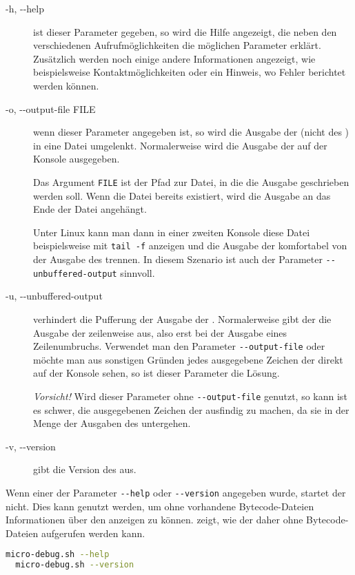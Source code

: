 \begin{description}
\item[-h, -{}-help]
  ist dieser Parameter gegeben, so wird die Hilfe angezeigt, die neben den verschiedenen Aufrufmöglichkeiten die möglichen Parameter erklärt. Zusätzlich werden noch einige andere Informationen angezeigt, wie beispielsweise Kontaktmöglichkeiten oder ein Hinweis, wo Fehler berichtet werden können.

\item[-o, -{}-output-file FILE]
  wenn dieser Parameter angegeben ist, so wird die Ausgabe der \mic (nicht des \md) in eine Datei umgelenkt. Normalerweise wird die Ausgabe der \mic auf der Konsole ausgegeben.

  Das Argument \texttt{FILE} ist der Pfad zur Datei, in die die Ausgabe geschrieben werden soll. Wenn die Datei bereits existiert, wird die Ausgabe an das Ende der Datei angehängt.

  Unter Linux kann man dann in einer zweiten Konsole diese Datei beispielsweise mit \texttt{tail~-f} anzeigen und die Ausgabe der \mic komfortabel von der Ausgabe des \md trennen. In diesem Szenario ist auch der Parameter \texttt{-{}-unbuffered-output} sinnvoll.

\item[-u, -{}-unbuffered-output]
  verhindert die Pufferung der Ausgabe der \mic. Normalerweise gibt der \md die Ausgabe der \mic zeilenweise aus, also erst bei der Ausgabe eines Zeilenumbruchs. Verwendet man den Parameter \texttt{-{}-output-file} oder möchte man aus sonstigen Gründen jedes ausgegebene Zeichen der \mic direkt auf der Konsole sehen, so ist dieser Parameter die Lösung.

  \emph{Vorsicht!} Wird dieser Parameter ohne \texttt{-{}-output-file} genutzt, so kann ist es schwer, die ausgegebenen Zeichen der \mic ausfindig zu machen, da sie in der Menge der Ausgaben des \md untergehen.

\item[-v, -{}-version]
  gibt die Version des \md aus.
\end{description}

Wenn einer der Parameter \texttt{-{}-help} oder \texttt{-{}-version} angegeben wurde, startet der \md nicht. Dies kann genutzt werden, um ohne vorhandene Bytecode-Dateien Informationen über den \md anzeigen zu können.  zeigt, wie der \md daher ohne Bytecode-Dateien aufgerufen werden kann.

\begin{lstlisting}[language=sh,caption={Aufruf des \md ohne Start -- Konsolenversion},label=\lstlbl{aufrufe-ohne-start}]
  micro-debug.sh --help
  micro-debug.sh --version
\end{lstlisting}

